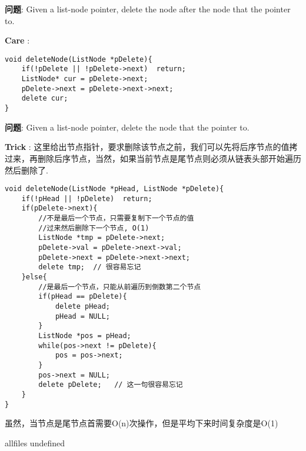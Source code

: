 \documentclass{article}
\begin{document}
\begin{CJK}{UTF8}{gbsn}     %

\else

\begin{description}
    \item{\textbf{问题}}: Given a list-node pointer, delete the node after the node that the pointer to.
    \item{\textbf{Care}} : 
    \begin{lstlisting}
void deleteNode(ListNode *pDelete){
	if(!pDelete || !pDelete->next)	return;
	ListNode* cur = pDelete->next;
	pDelete->next = pDelete->next->next; 
	delete cur;
}
    \end{lstlisting}
\end{description}
\begin{description}
    \item{\textbf{问题}}: Given a list-node pointer, delete the node that the pointer to.
    \item{\textbf{Trick}} : 
	这里给出节点指针，要求删除该节点之前，我们可以先将后序节点的值拷过来，再删除后序节点，当然，如果当前节点是尾节点则必须从链表头部开始遍历然后删除了.
    \begin{lstlisting}
void deleteNode(ListNode *pHead, ListNode *pDelete){
	if(!pHead || !pDelete)	return;
	if(pDelete->next){
		//不是最后一个节点，只需要复制下一个节点的值
		//过来然后删除下一个节点, O(1)
		ListNode *tmp = pDelete->next;
		pDelete->val = pDelete->next->val;
		pDelete->next = pDelete->next->next;
		delete tmp;	 // 很容易忘记
	}else{
		//是最后一个节点，只能从前遍历到倒数第二个节点
		if(pHead == pDelete){
			delete pHead;
			pHead = NULL;
		}
		ListNode *pos = pHead;
		while(pos->next != pDelete){
			pos = pos->next;
		}
		pos->next = NULL;
		delete pDelete;   // 这一句很容易忘记
	}
}
   \end{lstlisting}
\end{description}
	虽然，当节点是尾节点首需要O(n)次操作，但是平均下来时间复杂度是O(1)
\fi

\ifx allfiles undefined
\end{CJK}
\end{document}

